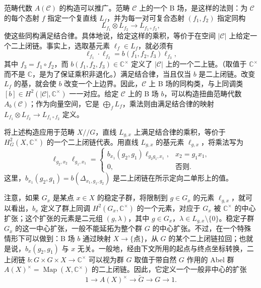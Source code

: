 范畴代数 $A(\mathcal{C})$ 的构造可以推广。范畴 $\mathcal{C}$ 上的一个 B 场，是这样的法则：为 $\mathcal{C}$ 的每个态射 $f$ 指定一个复直线 $L_f$，并为每一对可复合态射 $(f_1,f_2)$ 指定同构
\[
L_{f_1}\otimes L_{f_2}\longrightarrow L_{f_1\circ f_2},
\]
使这些同构满足结合律。具体地说，给定这样的乘积，等价于在空间 $|\mathcal{C}|$ 上给定一个二上闭链。事实上，选取基元素 $\ell_f\in L_f$，就必须有
\begin{equation}\label{eq:2.89}
\ell_{f_1}\cdot\ell_{f_2}=b(f_1,f_2,f_3)\ell_{f_3},
\end{equation}
其中 $f_3=f_1\circ f_2$，而 $b(f_1,f_2,f_3)\in\mathbb{C}^{\times}$ 定义了 $|\mathcal{C}|$ 上的一个二上链。（取值于 $\mathbb{C}^{\times}$ 而不是 $\mathbb{C}$，是为了保证乘积非退化。）满足结合律，当且仅当 $b$ 是二上闭链。改变 $L_f$ 的基，就会使 $b$ 改变一个上边界。因此，$\mathcal{C}$ 上 B 场的同构类，与上同调类 $[b]\in H^2(|\mathcal{C}|,\mathbb{C}^{\times})$ 一一对应。给定 $\mathcal{C}$ 上的 B 场 $b$，可以构造扭曲范畴代数 $A_b(\mathcal{C})$；作为向量空间，它是 $\bigoplus_fL_f$，乘法则由满足结合律的映射 $L_{f_1}\otimes L_{f_2}\to L_{f_1\circ f_2}$ 定义。

将上述构造应用于范畴 $X//G$，直线 $L_{g,x}$ 上满足结合律的乘积，等价于 $H_G^2(X,\mathbb{C}^{\times})$ 的一个二上闭链代表。用直线 $L_{g,x}$ 的基元素 $\ell_{g,x}$，将乘法写为
\begin{equation}\label{eq:2.90}
\ell_{g_2,x_2}\ell_{g_1,x_1}=
\begin{cases}
b_{x_1}(g_2,g_1)\ell_{g_2g_1,x_1},&x_2=g_1x_1,\\
0,&\text{否则}.
\end{cases}
\end{equation}
这里，$b_{x_1}(g_2,g_1)=b(\Delta_{x_1,g_1,g_2})$ 是二上闭链在所示定向二单形上的值。

注意，如果 $G_x$ 是某点 $x\in X$ 的稳定子群，将限制到 $g\in G_x$ 的元素 $\ell_{g,x}$，就可以看出，$b_x$ 定义了群上同调 $H^2(G_x,\mathbb{C}^{\times})$ 的一个元素，对应于 $G_x$ 被 $\mathbb{C}^{\times}$ 的中心扩张；这个扩张的元素是二元组 $(g,\lambda)$，其中 $g\in G_x$，$\lambda\in L_{g,x}\setminus\{0\}$。稳定子群 $G_x$ 的这一中心扩张，一般不能延拓为整个群 $G$ 的中心扩张。不过，在一个特殊情形下可以做到：B 场 $b$ 通过映射 $X\to\{\text{点}\}$，从 $G$ 的某个二上闭链拉回；也就是说，$b_x(g_2,g_1)$ 与 $x$ 无关。一般地，经由下文所用的起点与终点坐标转换，二上闭链 $b\colon G\times G\times X\to\mathbb{C}^{\times}$ 可以视为群 $G$ 取值于带自然 $G$ 作用的 Abel 群 $A(X)^{\times}=\operatorname{Map}(X,\mathbb{C}^{\times})$ 的二上闭链。因此，它定义一个一般非中心的扩张
\[
1\longrightarrow A(X)^{\times}\longrightarrow\widetilde{G}\longrightarrow G\longrightarrow1.
\]

